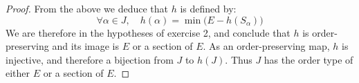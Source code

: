 \documentclass[11pt,a4paper,twoside]{article}
\theoremstyle{definition}
\begin{document}
\begin{proof}
  From the above we deduce that $h$ is defined by:
  \begin{equation*}
    \forall \alpha \in J, \quad h ( \alpha ) = \min \big( E - h ( S_\alpha ) \big)
  \end{equation*}
  We are therefore in the hypotheses of exercise 2, and conclude that $h$ is order-preserving and its image is $E$ or a section of $E$.
  As an order-preserving map, $h$ is injective, and therefore a bijection from $J$ to $h ( J )$. Thus $J$ has the order type of
  either $E$ or a section of $E$.

\end{proof}
\end{document}
